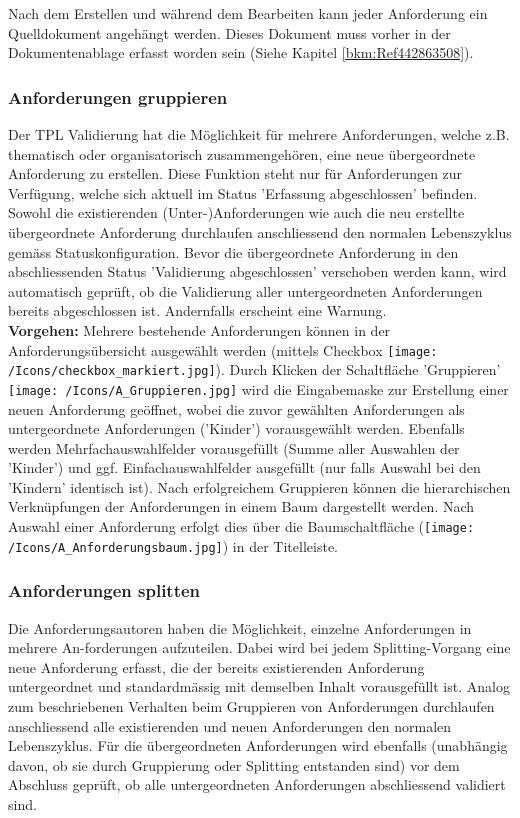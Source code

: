 Nach dem Erstellen und während dem Bearbeiten kann jeder Anforderung ein Quelldokument angehängt werden. Dieses Dokument muss vorher in der Dokumentenablage erfasst worden sein (Siehe Kapitel \ref{bkm:Ref442863508}). 

\subsubsection{Anforderungen gruppieren}

Der TPL Validierung hat die Möglichkeit für mehrere Anforderungen, welche z.B. thematisch oder organisatorisch zusammengehören, eine neue übergeordnete Anforderung zu erstellen. Diese Funktion steht nur für Anforderungen zur Verfügung, welche sich aktuell im Status 'Erfassung abgeschlossen' befinden. Sowohl die existierenden (Unter-)Anforderungen wie auch die neu erstellte übergeordnete Anforderung durchlaufen anschliessend den normalen Lebenszyklus gemäss Statuskonfiguration. Bevor die übergeordnete Anforderung in den abschliessenden Status 'Validierung abgeschlossen' verschoben werden kann, wird automatisch geprüft, ob die Validierung aller untergeordneten Anforderungen bereits abgeschlossen ist. Andernfalls erscheint eine Warnung. \\

\textbf{Vorgehen:}
Mehrere bestehende Anforderungen können in der Anforderungsübersicht ausgewählt werden (mittels Checkbox \texttt{[image: /Icons/checkbox\_markiert.jpg]}). Durch Klicken der Schaltfläche 'Gruppieren' \texttt{[image: /Icons/A\_Gruppieren.jpg]} wird die Eingabemaske zur Erstellung einer neuen Anforderung geöffnet, wobei die zuvor gewählten Anforderungen als untergeordnete Anforderungen ('Kinder') vorausgewählt werden. Ebenfalls werden Mehrfachauswahlfelder vorausgefüllt (Summe aller Auswahlen der 'Kinder') und ggf. Einfachauswahlfelder ausgefüllt (nur falls Auswahl bei den 'Kindern' identisch ist).
Nach erfolgreichem Gruppieren können die hierarchischen Verknüpfungen der Anforderungen in einem Baum dargestellt werden. Nach Auswahl einer Anforderung erfolgt dies über die Baumschaltfläche (\texttt{[image: /Icons/A\_Anforderungsbaum.jpg]}) in der Titelleiste.

\subsubsection{Anforderungen splitten}

Die Anforderungsautoren haben die Möglichkeit, einzelne Anforderungen in mehrere An-forderungen aufzuteilen. Dabei wird bei jedem Splitting-Vorgang eine neue Anforderung erfasst, die der bereits existierenden Anforderung untergeordnet und standardmässig mit demselben Inhalt vorausgefüllt ist. Analog zum beschriebenen Verhalten beim Gruppieren von Anforderungen durchlaufen anschliessend alle existierenden und neuen Anforderungen den normalen Lebenszyklus. Für die übergeordneten Anforderungen wird ebenfalls (unabhängig davon, ob sie durch Gruppierung oder Splitting entstanden sind) vor dem Abschluss geprüft, ob alle untergeordneten Anforderungen abschliessend validiert sind. \\

